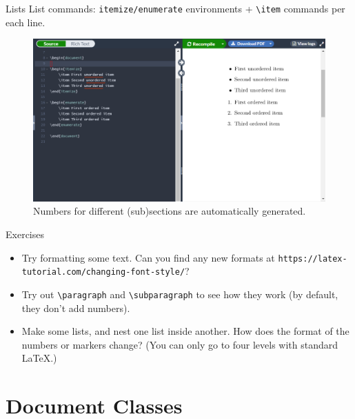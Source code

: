 \documentclass{beamer}
\begin{document}
{  \begin{frame}{Lists}
    List commands: \texttt{itemize/enumerate} environments + \texttt{\textbackslash item} commands per each line.
    \begin{figure}
      \includegraphics[width=0.9\linewidth]{day01-overleaf-06-lists.png}
      \caption{Numbers for different (sub)sections are automatically generated.}
      \label{fig:day01-overleaf-06-lists}
    \end{figure}
  \end{frame}

  \begin{frame}{Exercises}
  \begin{itemize}
    \item Try formatting some text. Can you find any new formats at \texttt{https://latex-tutorial.com/changing-font-style/}?
    \item Try out \texttt{\textbackslash paragraph} and \texttt{\textbackslash subparagraph} to see how they work (by default, they don’t add numbers).
    \item Make some lists, and nest one list inside another. How does the format of the numbers or markers change? (You can only go to four levels with standard \LaTeX.)
  \end{itemize}
  \end{frame}

  \section{Document Classes}

}
\end{document}
